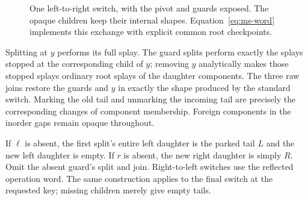 \documentclass[11pt]{article}
\numberwithin{equation}{section}
\begin{document}
\begin{figure}[ht]
\centering
{}
\caption{One left-to-right switch, with the pivot and guards exposed.
The opaque children keep their internal shapes. Equation~\eqref{eq:ms-word}
implements this exchange with explicit common root checkpoints.}
\label{fig:switch}
\end{figure}

Splitting at $y$ performs its full splay. The guard splits perform
exactly the splays stopped at the corresponding child of $y$; removing
$y$ analytically makes those stopped splays ordinary root splays of
the daughter components. The three raw joins restore the guards and
$y$ in exactly the shape produced by the standard switch. Marking the
old tail and unmarking the incoming tail are precisely the corresponding
changes of component membership. Foreign components in the inorder
gaps remain opaque throughout.

If $\ell$ is absent, the first split's entire left daughter is the
parked tail $L$ and the new left daughter is empty. If $r$ is absent,
the new right daughter is simply $R$. Omit the absent guard's split and
join. Right-to-left switches use the reflected operation word. The
same construction applies to the final switch at the requested key;
missing children merely give empty tails.
\end{document}
